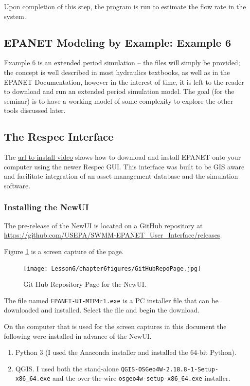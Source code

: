 Upon completion of this step, the program is run to estimate the flow rate in the system.
\clearpage

\subsection{EPANET Modeling by Example:  Example 6}
Example 6 is an extended period simulation -- the files will simply be provided; the concept is well described in most hydraulics textbooks, as well as in the EPANET Documentation, however in the interest of time, it is left to the reader to download and run an extended period simulation model.  The goal (for the seminar) is to have a working model of some complexity to explore the other tools discussed later.
\clearpage

\subsection{The Respec Interface}
The \url{url to install video} shows how to download and install EPANET onto your computer using the newer Respec GUI.  This interface was built to be GIS aware and facilitate integration of an asset management database and the simulation software.  

\subsubsection{Installing the NewUI}
The pre-release of the NewUI is located on a GitHub repository at
\url{https://github.com/USEPA/SWMM-EPANET_User_Interface/releases}.

Figure \ref{fig:GitHubRepoPage} is a screen capture of the page.
   
\begin{figure}[htbp] %
   \centering
   \texttt{[image: Lesson6/chapter6figures/GitHubRepoPage.jpg]} 
   \caption{Git Hub Repository Page for the NewUI.}
   \label{fig:GitHubRepoPage}
\end{figure}

The file named \texttt{EPANET-UI-MTP4r1.exe} is a PC installer file that can be downloaded and installed.   
Select the file and begin the download.

On the computer that is used for the screen captures in this document the following were installed in advance of the NewUI.
\begin{enumerate}
\item Python 3 (I used the Anaconda installer and installed the 64-bit Python).
\item QGIS.  I used both the stand-alone \texttt{QGIS-OSGeo4W-2.18.8-1-Setup-x86\_64.exe} and the over-the-wire \texttt{osgeo4w-setup-x86\_64.exe} installer.
\end{enumerate}

